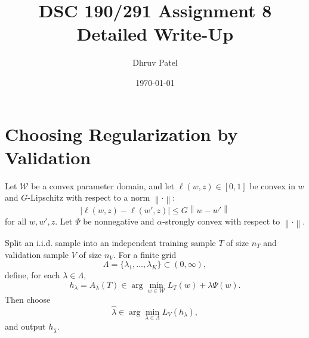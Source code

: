 \documentclass[11pt]{article}
\title{\textbf{DSC 190/291 Assignment 8}\\Detailed Write-Up}
\author{Dhruv Patel}
\date{\today}
\newcommand{\norm}[1]{\left\lVert #1 \right\rVert}
\begin{document}
\maketitle
\tableofcontents
\newpage

\section{Choosing Regularization by Validation}

Let $\mathcal W$ be a convex parameter domain, and let $\ell(w,z)\in[0,1]$ be convex in $w$ and $G$-Lipschitz with respect to a norm $\norm{\cdot}$:
\[
|\ell(w,z)-\ell(w',z)|\le G\norm{w-w'}
\]
for all $w,w',z$. Let $\Psi$ be nonnegative and $\alpha$-strongly convex with respect to $\norm{\cdot}$.

Split an i.i.d. sample into an independent training sample $T$ of size $n_T$ and validation sample $V$ of size $n_V$. For a finite grid
\[
\Lambda=\{\lambda_1,\ldots,\lambda_K\}\subset(0,\infty),
\]
define, for each $\lambda\in\Lambda$,
\[
h_\lambda=A_\lambda(T)\in\arg\min_{w\in\mathcal W} L_T(w)+\lambda\Psi(w).
\]
Then choose
\[
\widehat\lambda\in\arg\min_{\lambda\in\Lambda}L_V(h_\lambda),
\]
and output $h_{\widehat\lambda}$.
\end{document}
